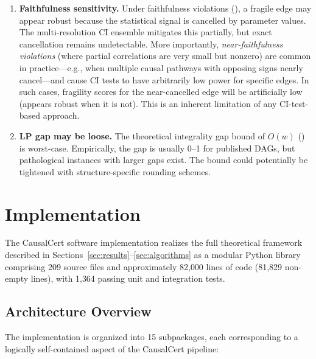 \documentclass[11pt,a4paper]{article}
\theoremstyle{definition}
\theoremstyle{remark}
\begin{document}
\begin{enumerate}
\item \textbf{Faithfulness sensitivity.} Under faithfulness violations (),
  a fragile edge may appear robust because the statistical signal is cancelled by parameter
  values. The multi-resolution CI ensemble mitigates this partially, but exact
  cancellation remains undetectable. More importantly, \emph{near-faithfulness violations}
  (where partial correlations are very small but nonzero) are common in practice---e.g.,
  when multiple causal pathways with opposing signs nearly cancel---and cause CI tests to
  have arbitrarily low power for specific edges. In such cases, fragility scores for the
  near-cancelled edge will be artificially low (appears robust when it is not). This is
  an inherent limitation of any CI-test-based approach.

\item \textbf{LP gap may be loose.} The theoretical integrality gap bound of $O(w)$
  () is worst-case. Empirically, the gap is usually 0--1 for published
  DAGs, but pathological instances with larger gaps exist. The bound could potentially
  be tightened with structure-specific rounding schemes.
\end{enumerate}


\section{Implementation}\label{sec:implementation}

The CausalCert software implementation realizes the full theoretical framework
described in Sections~\ref{sec:results}--\ref{sec:algorithms} as a modular
Python library comprising 209 source files and approximately 82{,}000 lines of
code (81{,}829 non-empty lines), with 1{,}364 passing unit and integration tests.

\subsection{Architecture Overview}\label{sec:arch}

The implementation is organized into 15 subpackages, each corresponding to a
logically self-contained aspect of the CausalCert pipeline:
\end{document}
